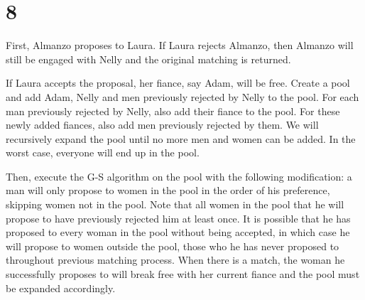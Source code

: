 \documentclass{article}
\begin{document}
\section*{8}

First, Almanzo proposes to Laura. If Laura rejects Almanzo, then Almanzo will still be engaged with Nelly and the original matching is returned.

If Laura accepts the proposal, her fiance, say Adam, will be free. Create a pool and add Adam, Nelly and men previously rejected by Nelly to the pool. For each man previously rejected by Nelly, also add their fiance to the pool. For these newly added fiances, also add men previously rejected by them. We will recursively expand the pool until no more men and women can be added. In the worst case, everyone will end up in the pool.

Then, execute the G-S algorithm on the pool with the following modification: a man will only propose to women in the pool in the order of his preference, skipping women not in the pool. Note that all women in the pool that he will propose to have previously rejected him at least once.  It is possible that he has proposed to every woman in the pool without being accepted, in which case he will propose to women outside the pool, those who he has never proposed to throughout previous matching process. When there is a match, the woman he successfully proposes to will break free with her current fiance and the pool must be expanded accordingly.
\end{document}
